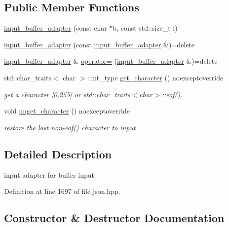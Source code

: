 \subsection*{Public Member Functions}
\begin{DoxyCompactItemize}
\item 
\hyperlink{classnlohmann_1_1detail_1_1input__buffer__adapter_aee9d094d369bcd8f110eae4a175a8fa9}{input\+\_\+buffer\+\_\+adapter} (const char $\ast$b, const std\+::size\+\_\+t l)
\item 
\hyperlink{classnlohmann_1_1detail_1_1input__buffer__adapter_ada76d7b75c5d6b989af0e18687ef07b6}{input\+\_\+buffer\+\_\+adapter} (const \hyperlink{classnlohmann_1_1detail_1_1input__buffer__adapter}{input\+\_\+buffer\+\_\+adapter} \&)=delete
\item 
\hyperlink{classnlohmann_1_1detail_1_1input__buffer__adapter}{input\+\_\+buffer\+\_\+adapter} \& \hyperlink{classnlohmann_1_1detail_1_1input__buffer__adapter_a0871125057d993684ba8e45fb2b8a76b}{operator=} (\hyperlink{classnlohmann_1_1detail_1_1input__buffer__adapter}{input\+\_\+buffer\+\_\+adapter} \&)=delete
\item 
std\+::char\+\_\+traits$<$ char $>$\+::int\+\_\+type \hyperlink{classnlohmann_1_1detail_1_1input__buffer__adapter_a3a8ded2e453b8372353aed38302f30f1}{get\+\_\+character} () noexceptoverride
\begin{DoxyCompactList}\small\item\em get a character \mbox{[}0,255\mbox{]} or std\+::char\+\_\+traits$<$char$>$\+::eof(). \end{DoxyCompactList}\item 
void \hyperlink{classnlohmann_1_1detail_1_1input__buffer__adapter_a428d0ad853394233bffb8ceae9871a63}{unget\+\_\+character} () noexceptoverride
\begin{DoxyCompactList}\small\item\em restore the last non-\/eof() character to input \end{DoxyCompactList}\end{DoxyCompactItemize}


\subsection{Detailed Description}
input adapter for buffer input 

Definition at line 1697 of file json.\+hpp.



\subsection{Constructor \& Destructor Documentation}

